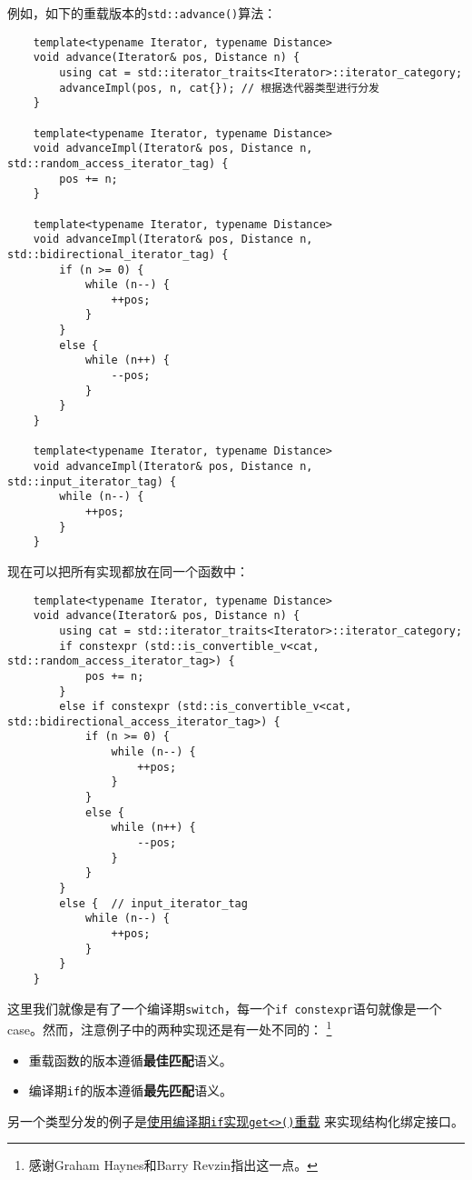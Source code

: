 例如，如下的重载版本的\texttt{std::advance()}算法：
\begin{lstlisting}
    template<typename Iterator, typename Distance>
    void advance(Iterator& pos, Distance n) {
        using cat = std::iterator_traits<Iterator>::iterator_category;
        advanceImpl(pos, n, cat{}); // 根据迭代器类型进行分发
    }

    template<typename Iterator, typename Distance>
    void advanceImpl(Iterator& pos, Distance n, std::random_access_iterator_tag) {
        pos += n;
    }

    template<typename Iterator, typename Distance>
    void advanceImpl(Iterator& pos, Distance n, std::bidirectional_iterator_tag) {
        if (n >= 0) {
            while (n--) {
                ++pos;
            }
        }
        else {
            while (n++) {
                --pos;
            }
        }
    }

    template<typename Iterator, typename Distance>
    void advanceImpl(Iterator& pos, Distance n, std::input_iterator_tag) {
        while (n--) {
            ++pos;
        }
    }
\end{lstlisting}
现在可以把所有实现都放在同一个函数中：
\begin{lstlisting}
    template<typename Iterator, typename Distance>
    void advance(Iterator& pos, Distance n) {
        using cat = std::iterator_traits<Iterator>::iterator_category;
        if constexpr (std::is_convertible_v<cat, std::random_access_iterator_tag>) {
            pos += n;
        }
        else if constexpr (std::is_convertible_v<cat, std::bidirectional_access_iterator_tag>) {
            if (n >= 0) {
                while (n--) {
                    ++pos;
                }
            }
            else {
                while (n++) {
                    --pos;
                }
            }
        }
        else {  // input_iterator_tag
            while (n--) {
                ++pos;
            }
        }
    }
\end{lstlisting}
这里我们就像是有了一个编译期\texttt{switch}，每一个\texttt{if constexpr}语句就像是一个
case。然而，注意例子中的两种实现还是有一处不同的：
\footnote{感谢Graham Haynes和Barry Revzin指出这一点。}
\begin{itemize}
    \item 重载函数的版本遵循\textbf{最佳匹配}语义。
    \item 编译期\texttt{if}的版本遵循\textbf{最先匹配}语义。
\end{itemize}
另一个类型分发的例子是\hyperref[编译期if实现get<>]{使用编译期\texttt{if}实现\texttt{get<>()}重载}
来实现结构化绑定接口。


